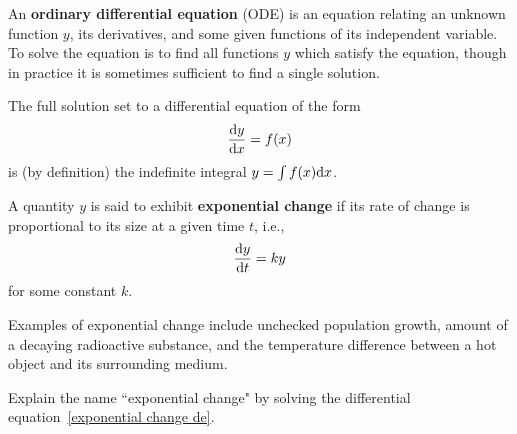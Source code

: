 

\begin{definition}
An \textbf{ordinary differential equation} (ODE) is an equation relating an unknown function $y$, its derivatives, and some given functions of its independent variable.
To solve the equation is to find all functions $y$ which satisfy the equation, though in practice it is sometimes sufficient to find a single solution.
\end{definition}

\begin{remark}
The full solution set to a differential equation of the form
\begin{equation*}
\frac{\mathrm{d} y}{\mathrm{d} x} = f(x)
\end{equation*}
is (by definition) the indefinite integral $y = \int f(x)\mathrm{d} x$.
\end{remark}

\begin{definition}
A quantity $y$ is said to exhibit \textbf{exponential change} if its rate of change is proportional to its size at a given time $t$, i.e., 
\begin{equation}\label{exponential change de}
\frac{\mathrm{d} y}{\mathrm{d} t} = ky
\end{equation}
for some constant $k$.
\end{definition}

\begin{remark}
Examples of exponential change include unchecked population growth, amount of a decaying radioactive substance, and the temperature difference between a hot object and its surrounding medium.
\end{remark}

\begin{example}
Explain the name ``exponential change" by solving the differential equation~\eqref{exponential change de}.
\end{example}

\ifdefined\SOLUTION
{}
\else
\fi


